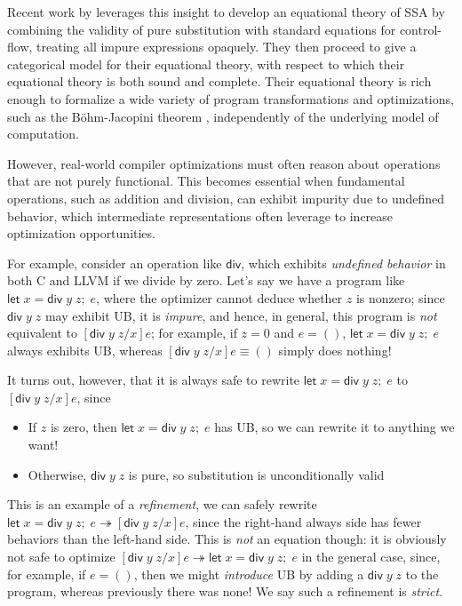 \documentclass[acmsmall,screen,review]{acmart}
\newcommand{\ms}[1]{\ensuremath{\mathsf{#1}}}
\newcommand{\letexpr}[3]{\ensuremath{\ms{let}\;#1 = #2;\;#3}}
\newcommand{\tref}{\twoheadrightarrow}
\begin{document}
Recent work by \citet{ghalayini-24-ssa-densem-arxiv} leverages this insight to develop an equational
theory of SSA by combining the validity of pure substitution with standard equations for
control-flow, treating all impure expressions opaquely. They then proceed to give a categorical
model for their equational theory, with respect to which their equational theory is both sound and
complete. Their equational theory is rich enough to formalize a wide variety of program
transformations and optimizations, such as the B\"ohm-Jacopini theorem \cite{bohm-jacopini},
independently of the underlying model of computation.

However, real-world compiler optimizations must often reason about operations that are not purely
functional. This becomes essential when fundamental operations, such as addition and division, can
exhibit impurity due to undefined behavior, which intermediate representations often leverage to
increase optimization opportunities. 

For example, consider an operation like \ms{div}, which exhibits \emph{undefined behavior} in both C
and LLVM if we divide by zero. Let's say we have a program like $\letexpr{x}{\ms{div}\;y\;z}{e}$,
where the optimizer cannot deduce whether $z$ is nonzero; since $\ms{div}\;y\;z$ may exhibit UB, it
is \emph{impure}, and hence, in general, this program is \emph{not} equivalent to
$[\ms{div}\;y\;z/x]e$; for example, if $z = 0$ and $e = ()$, $\letexpr{x}{\ms{div}\;y\;z}{e}$ always
exhibits UB, whereas $[\ms{div}\;y\;z/x]e \equiv ()$ simply does nothing!

It turns out, however, that it is always safe to rewrite $\letexpr{x}{\ms{div}\;y\;z}{e}$ to
$[\ms{div}\;y\;z/x]e$, since
\begin{itemize}
  \item If $z$ is zero, then $\letexpr{x}{\ms{div}\;y\;z}{e}$ has UB, so we can rewrite it to
  anything we want!
  \item Otherwise, $\ms{div}\;y\;z$ is pure, so substitution is unconditionally valid
\end{itemize}
This is an example of a \emph{refinement}, we can safely rewrite $\letexpr{x}{\ms{div}\;y\;z}{e}
\tref [\ms{div}\;y\;z/x]e$, since the right-hand always side has fewer behaviors than the left-hand
side. This is \emph{not} an equation though: it is obviously not safe to optimize
$[\ms{div}\;y\;z/x]e \tref \letexpr{x}{\ms{div}\;y\;z}{e}$ in the general case, since, for example,
if $e = ()$, then we might \emph{introduce} UB by adding a $\ms{div}\;y\;z$ to the program, whereas
previously there was none! We say such a refinement is \emph{strict}.
\end{document}
